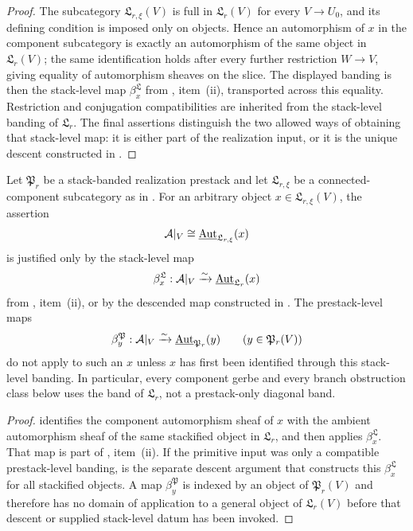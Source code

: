 \begin{proof}
The subcategory $\mathfrak L_{r,\xi}(V)$ is full in
$\mathfrak L_r(V)$ for every $V\to U_0$, and its defining condition is imposed
only on objects. Hence an automorphism of $x$ in the component subcategory is
exactly an automorphism of the same object in $\mathfrak L_r(V)$; the same
identification holds after every further restriction $W\to V$, giving equality
of automorphism sheaves on the slice. The displayed banding is then the
stack-level map $\beta^{\mathfrak L}_x$ from
, item~\textup{(ii)}, transported across this equality.
Restriction and conjugation compatibilities are inherited from the stack-level
banding of $\mathfrak L_r$. The final assertions distinguish the two allowed
ways of obtaining that stack-level map: it is either part of the realization
input, or it is the unique descent constructed in
.
\end{proof}

\begin{corollary}\label{cor:no-prestack-only-component-band}
Let $\mathfrak P_r$ be a stack-banded realization prestack and let
$\mathfrak L_{r,\xi}$ be a connected-component subcategory as in
. For an arbitrary object
$x\in\mathfrak L_{r,\xi}(V)$, the assertion
\[
\mathcal{A}|_V\cong
\underline{\mathrm{Aut}}_{\mathfrak L_{r,\xi}}(x)
\]
is justified only by the stack-level map
\[
\beta^{\mathfrak L}_x:\mathcal{A}|_V\xrightarrow{\sim}
\underline{\mathrm{Aut}}_{\mathfrak L_r}(x)
\]
from , item~\textup{(ii)}, or by the descended map
constructed in . The prestack-level
maps
\[
\beta^{\mathfrak P}_y:\mathcal{A}|_V\xrightarrow{\sim}
\underline{\mathrm{Aut}}_{\mathfrak P_r}(y)
\qquad (y\in\mathfrak P_r(V))
\]
do not apply to such an $x$ unless $x$ has first been identified through this
stack-level banding. In particular, every component gerbe and every branch
obstruction class below uses the band of $\mathfrak L_r$, not a
prestack-only diagonal band.
\end{corollary}

\begin{proof}
 identifies the component automorphism sheaf of
$x$ with the ambient automorphism sheaf of the same stackified object in
$\mathfrak L_r$, and then applies $\beta^{\mathfrak L}_x$. That map is part of
, item~\textup{(ii)}. If the primitive input was only a
compatible prestack-level banding,  is
the separate descent argument that constructs this $\beta^{\mathfrak L}_x$ for
all stackified objects. A map $\beta^{\mathfrak P}_y$ is indexed by an object of
$\mathfrak P_r(V)$ and therefore has no domain of application to a general
object of $\mathfrak L_r(V)$ before that descent or supplied stack-level datum
has been invoked.
\end{proof}

